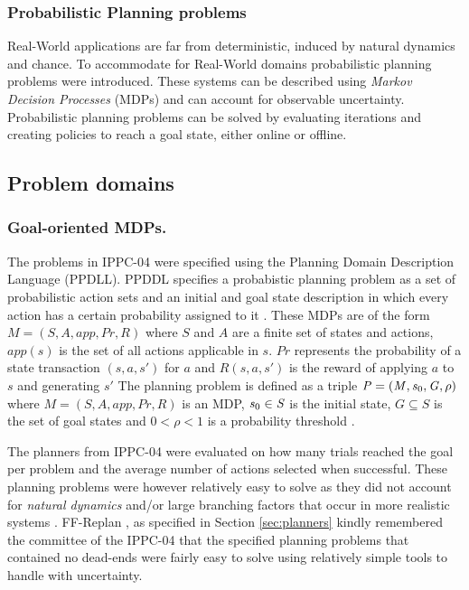 \documentclass[runningheads,a4paper]{llncs}
\begin{document}
\subsubsection{Probabilistic Planning problems}
Real-World applications are far from deterministic, induced by natural dynamics and chance. To accommodate for Real-World domains probabilistic planning problems were introduced.  These systems can be described using \emph{Markov Decision Processes} (MDPs) and can account for observable uncertainty. Probabilistic planning problems can be solved by evaluating iterations and creating policies to reach a goal state, either online or offline.

\subsection{Problem domains}
\subsubsection{Goal-oriented MDPs. }The problems in IPPC-04 were specified using the Planning Domain Description Language (PPDLL). PPDDL specifies a probabistic planning problem as a set of probabilistic action sets and an initial and goal state description in which every action has a certain probability assigned to it \cite{FFReplan}. These MDPs are of the form $\mathit{M = (S, A, app, Pr, R)}$ where $\mathit{S}$ and $\mathit{A}$ are a finite set of states and actions, $\mathit{app(s)}$ is the set of all actions applicable in $\mathit{s}$. $\mathit{Pr}$ represents the probability of a state transaction $\mathit{(s, a, s')}$ for $\mathit{a}$ and $\mathit{R(s, a, s')}$ is the reward of applying $\mathit{a}$ to $\mathit{s}$ and generating $\mathit{s'}$ The planning problem is defined as a triple $\mathit{P = (M, s\textsubscript{0}, G, \rho)}$ where $\mathit{M = (S, A, app, Pr, R)}$ is an MDP, $\mathit{s\textsubscript{0} \in S}$ is the initial state, $\mathit{G \subseteq S}$ is the set of goal states and $\mathit{0 < \rho < 1}$ is a probability threshold \cite{teichteil2010incremental}.

 The planners from IPPC-04 were evaluated on how many trials reached the goal per problem and the average number of actions selected when successful. These planning problems were however relatively easy to solve as they did not account for \emph{natural dynamics} and/or large branching factors that occur in more realistic systems \cite{kolobov2012glutton}. FF-Replan \cite{FFReplan}, as specified in Section \ref{sec:planners} kindly remembered the committee of the IPPC-04 that the specified planning problems that contained no dead-ends were fairly easy to solve using relatively simple tools to handle with uncertainty.
\end{document}

